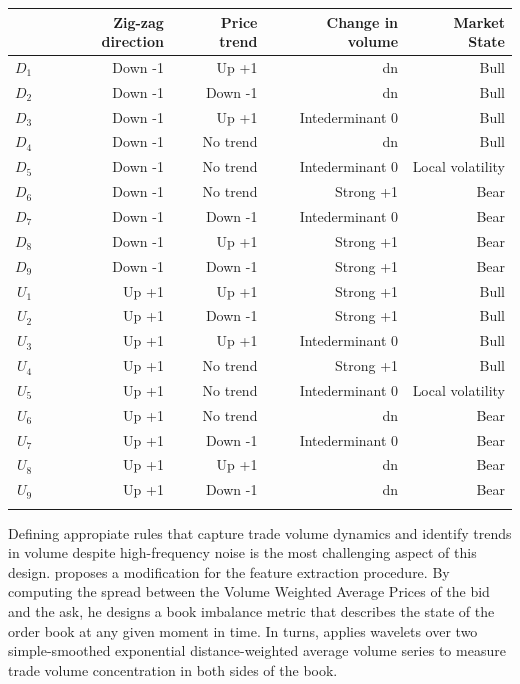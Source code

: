 \documentclass[]{article}
\begin{document}
\begin{table}[ht]
\centering
\begingroup\footnotesize
\begin{tabularx}{0.7 \textwidth}{rrrrr}
  \toprule
 & Zig-zag direction & Price trend & Change in volume & Market State \\ 
  \midrule
$D_{1}$ & Down -1 & Up +1 & dn & Bull \\ 
  $D_{2}$ & Down -1 & Down -1 & dn & Bull \\ 
  $D_{3}$ & Down -1 & Up +1 & Intederminant 0 & Bull \\ 
  $D_{4}$ & Down -1 & No trend & dn & Bull \\ 
  $D_{5}$ & Down -1 & No trend & Intederminant 0 & Local volatility \\ 
  $D_{6}$ & Down -1 & No trend & Strong +1 & Bear \\ 
  $D_{7}$ & Down -1 & Down -1 & Intederminant 0 & Bear \\ 
  $D_{8}$ & Down -1 & Up +1 & Strong +1 & Bear \\ 
  $D_{9}$ & Down -1 & Down -1 & Strong +1 & Bear \\ 
   \midrule
$U_{1}$ & Up +1 & Up +1 & Strong +1 & Bull \\ 
  $U_{2}$ & Up +1 & Down -1 & Strong +1 & Bull \\ 
  $U_{3}$ & Up +1 & Up +1 & Intederminant 0 & Bull \\ 
  $U_{4}$ & Up +1 & No trend & Strong +1 & Bull \\ 
  $U_{5}$ & Up +1 & No trend & Intederminant 0 & Local volatility \\ 
  $U_{6}$ & Up +1 & No trend & dn & Bear \\ 
  $U_{7}$ & Up +1 & Down -1 & Intederminant 0 & Bear \\ 
  $U_{8}$ & Up +1 & Up +1 & dn & Bear \\ 
  $U_{9}$ & Up +1 & Down -1 & dn & Bear \\ 
   \bottomrule
\multicolumn{4}{l}{}\\
\end{tabularx}
\endgroup
\end{table}

Defining appropiate rules that capture trade volume dynamics and
identify trends in volume despite high-frequency noise is the most
challenging aspect of this design. \citet{wisebourt2011hierarchical}
proposes a modification for the feature extraction procedure. By
computing the spread between the Volume Weighted Average Prices of the
bid and the ask, he designs a book imbalance metric that describes the
state of the order book at any given moment in time. In turns,
\citet{sandoval2015computational} applies wavelets over two
simple-smoothed exponential distance-weighted average volume series to
measure trade volume concentration in both sides of the book.
\end{document}
